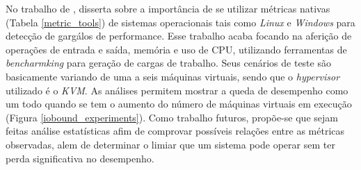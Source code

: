 No trabalho de , disserta sobre a importância de se utilizar métricas nativas (Tabela \ref{metric_tools}) de sistemas  operacionais tais como \textit{Linux} e \textit{Windows} para detecção de gargálos de performance. Esse trabalho acaba focando na aferição de operações de entrada e saída, memória e uso de CPU, utilizando ferramentas de \textit{bencharmking} para geração de cargas de trabalho. Seus cenários de teste são basicamente variando de uma a seis máquinas virtuais, sendo que o \textit{hypervisor} utilizado é o \textit{KVM}. As análises permitem mostrar a queda de desempenho como um todo quando se tem o aumento do número de máquinas virtuais em execução (Figura \ref{iobound_experiments}). Como trabalho futuros, propõe-se que sejam feitas análise estatísticas afim de comprovar possíveis relações entre as métricas observadas, alem de determinar o limiar que um sistema pode operar sem ter perda significativa no desempenho.

